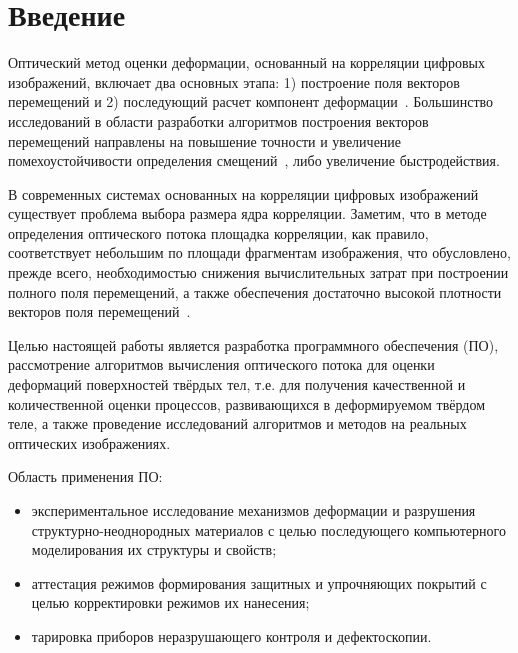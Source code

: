 \newpage
\section{Введение}



Оптический метод оценки деформации, основанный на корреляции цифровых изображений, включает два основных этапа: 1) построение поля векторов перемещений и 2) последующий расчет компонент деформации~\cite{pan_intro_one}. Большинство исследований в области разработки алгоритмов построения векторов перемещений направлены на повышение точности и увеличение помехоустойчивости определения смещений~\cite{pan_intro_two, pan_intro_three}, либо увеличение быстродействия.

В современных системах основанных на корреляции цифровых изображений существует проблема выбора размера ядра корреляции. 
Заметим, что в методе определения оптического потока площадка корреляции, как правило, соответствует небольшим по площади фрагментам изображения, что обусловлено, прежде всего, необходимостью снижения вычислительных затрат при построении полного поля перемещений, а также обеспечения достаточно высокой плотности векторов поля перемещений~\cite{tom_lyk, Lucas1981}.

Целью настоящей работы является разработка программного обеспечения (ПО), рассмотрение алгоритмов вычисления оптического потока для оценки деформаций поверхностей твёрдых тел, т.е. для получения качественной и количественной оценки процессов, развивающихся в деформируемом твёрдом теле, а также проведение исследований алгоритмов и методов на реальных оптических изображениях.

Область применения ПО:
\begin{itemize}
\item экспериментальное исследование механизмов деформации и разрушения структурно-неоднородных материалов с целью последующего компьютерного моделирования их структуры и свойств;
\item аттестация режимов формирования защитных и упрочняющих покрытий с целью корректировки режимов их нанесения;
\item тарировка приборов неразрушающего контроля и дефектоскопии.
\end{itemize}

